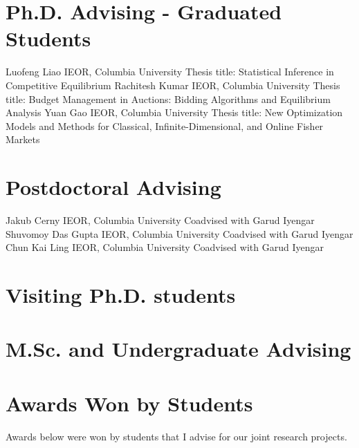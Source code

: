 \documentclass[11pt,a4paper,sans]{moderncv}        %
\newif\ifpromotion
\begin{document}
\section{Ph.D. Advising - Graduated Students}
  {Luofeng Liao}
  {IEOR, Columbia University}
  {}
  {Thesis title: Statistical Inference in Competitive Equilibrium}
  {Rachitesh Kumar}
  {IEOR, Columbia University}
  {}
  {Thesis title: Budget Management in Auctions: Bidding Algorithms and Equilibrium Analysis}
  {Yuan Gao}
  {IEOR, Columbia University}
  {}
  {Thesis title: New Optimization Models and Methods for Classical, \newline Infinite-Dimensional, and Online Fisher Markets}

\section{Postdoctoral Advising}
{Jakub Cerny}
{IEOR, Columbia University}
{}
{Coadvised with Garud Iyengar}
{Shuvomoy Das Gupta}
{IEOR, Columbia University}
{}
{Coadvised with Garud Iyengar}
{Chun Kai Ling}
{IEOR, Columbia University}
{}
{Coadvised with Garud Iyengar}

\section{Visiting Ph.D. students}
\section{M.Sc. and Undergraduate Advising}
\ifpromotion
\cventry{2024-2025}{BS (graduated 2022, but mentoring for PhD applications now)}{Noah Krever}{CS, Columbia University}{}{}{}
\fi
{}

\section{Awards Won by Students}
Awards below were won by students that I advise for our joint research projects.
\end{document}
